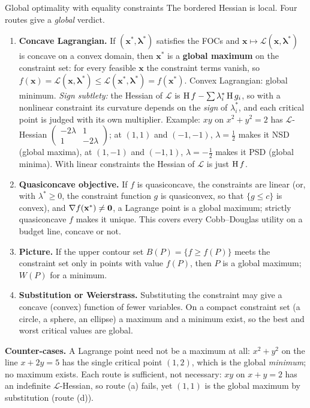 \begin{rulebox}{Global optimality with equality constraints}
The bordered Hessian is local. Four routes give a \emph{global} verdict.
\begin{enumerate}[label=(\alph*),leftmargin=1.8em,itemsep=0.3ex]
  \item \textbf{Concave Lagrangian.} If $(\mathbf{x}^*,\boldsymbol{\lambda}^*)$
        satisfies the FOCs and $\mathbf{x}\mapsto\mathcal{L}(\mathbf{x},\boldsymbol{\lambda}^*)$
        is concave on a convex domain, then $\mathbf{x}^*$ is a
        \textbf{global maximum} on the constraint set: for every feasible
        $\mathbf{x}$ the constraint terms vanish, so
        $f(\mathbf{x})=\mathcal{L}(\mathbf{x},\boldsymbol{\lambda}^*)
        \le\mathcal{L}(\mathbf{x}^*,\boldsymbol{\lambda}^*)=f(\mathbf{x}^*)$.
        Convex Lagrangian: global minimum. \emph{Sign subtlety:} the
        Hessian of $\mathcal{L}$ is
        $\operatorname{H} f-\sum\lambda_i^*\operatorname{H} g_i$, so with a nonlinear constraint its
        curvature depends on the \emph{sign} of $\lambda_i^*$, and each
        critical point is judged with its own multiplier. Example:
        $xy$ on $x^{2}+y^{2}=2$ has $\mathcal{L}$-Hessian
        $\begin{pmatrix}-2\lambda&1\\1&-2\lambda\end{pmatrix}$; at
        $(1,1)$ and $(-1,-1)$, $\lambda=\tfrac12$ makes it NSD (global
        maxima), at $(1,-1)$ and $(-1,1)$, $\lambda=-\tfrac12$ makes it PSD
        (global minima). With linear constraints the Hessian of
        $\mathcal{L}$ is just $\operatorname{H} f$.
  \item \textbf{Quasiconcave objective.} If $f$ is quasiconcave, the
        constraints are linear (or, with $\lambda^*\ge0$, the constraint
        function $g$ is quasiconvex, so that $\{g\le c\}$ is convex), and
        $\nabla f(\mathbf{x}^*)\neq\mathbf{0}$, a Lagrange point is a global
        maximum; strictly quasiconcave $f$ makes it unique. This covers
        every Cobb--Douglas utility on a budget line, concave or not.
  \item \textbf{Picture.} If the upper contour set $B(P)=\{f\ge f(P)\}$
        meets the constraint set only in points with value $f(P)$, then $P$
        is a global maximum; $W(P)$ for a minimum.
  \item \textbf{Substitution or Weierstrass.} Substituting the constraint
        may give a concave (convex) function of fewer variables. On a
        compact constraint set (a circle, a sphere, an ellipse) a maximum
        and a minimum exist, so the best and worst critical values are
        global.
\end{enumerate}
\textbf{Counter-cases.} A Lagrange point need not be a maximum at all:
$x^{2}+y^{2}$ on the line $x+2y=5$ has the single critical point $(1,2)$,
which is the global \emph{minimum}; no maximum exists. Each route is
sufficient, not necessary: $xy$ on $x+y=2$ has an indefinite
$\mathcal{L}$-Hessian, so route (a) fails, yet $(1,1)$ is the global
maximum by substitution (route (d)).
\end{rulebox}


